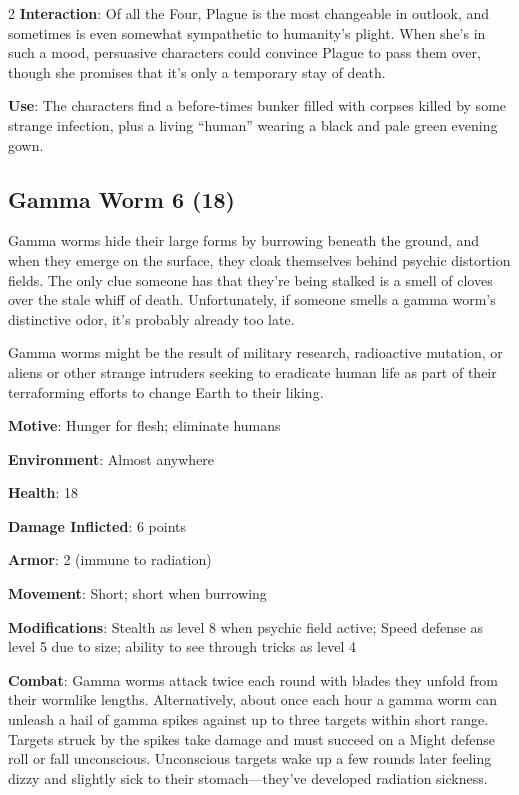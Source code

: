 \begin{multicols}{2}
\textbf{Interaction}: Of all the Four, Plague is the most changeable in outlook, and sometimes is even somewhat sympathetic to humanity’s plight. When she’s in such a mood, persuasive characters could convince Plague to pass them over, though she promises that it’s only a temporary stay of death.

\textbf{Use}: The characters find a before‑times bunker filled with corpses killed by some strange infection, plus a living “human” wearing a black and pale green evening gown.

\subsection{Gamma Worm 6 (18)}

Gamma worms hide their large forms by burrowing beneath the ground, and when they emerge on the surface, they cloak themselves behind psychic distortion fields. The only clue someone has that they’re being stalked is a smell of cloves over the stale whiff of death. Unfortunately, if someone smells a gamma worm’s distinctive odor, it’s probably already too late. 

Gamma worms might be the result of military research, radioactive mutation, or aliens or other strange intruders seeking to eradicate human life as part of their terraforming efforts to change Earth to their liking.

\textbf{Motive}: Hunger for flesh; eliminate humans 

\textbf{Environment}: Almost anywhere 

\textbf{Health}: 18 

\textbf{Damage Inflicted}: 6 points 

\textbf{Armor}: 2 (immune to radiation) 

\textbf{Movement}: Short; short when burrowing 

\textbf{Modifications}: Stealth as level 8 when psychic field active; Speed defense as level 5 due to size; ability to see through tricks as level 4 

\textbf{Combat}: Gamma worms attack twice each round with blades they unfold from their wormlike lengths. Alternatively, about once each hour a gamma worm can unleash a hail of gamma spikes against up to three targets within short range. Targets struck by the spikes take damage and must succeed on a Might defense roll or fall unconscious. Unconscious targets wake up a few rounds later feeling dizzy and slightly sick to their stomach—they’ve developed radiation sickness. 


\end{multicols}
